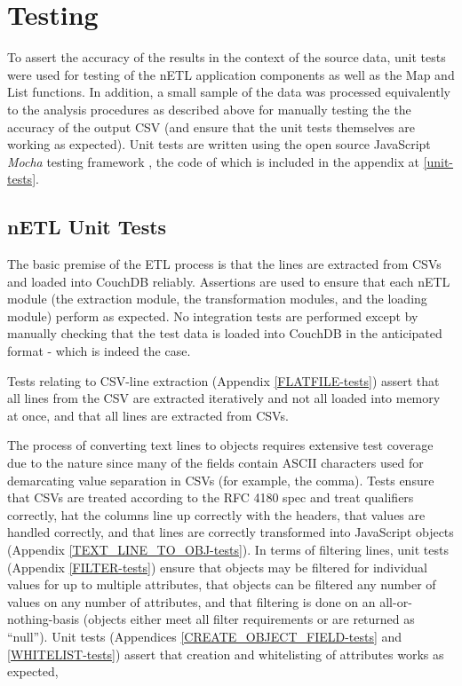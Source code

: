 \section{Testing}
To assert the accuracy of the results in the context of the source data, unit tests were used for testing of the nETL application components as well as the Map and List functions. In addition, a small sample of the data was processed equivalently to the analysis procedures as described above for manually testing the the accuracy of the output CSV (and ensure that the unit tests themselves are working as expected). Unit tests are written using the open source JavaScript \textit{Mocha} testing framework \cite{mochaTest}, the code of which is included in the appendix at \ref{unit-tests}.

\subsection{nETL Unit Tests}
The basic premise of the ETL process is that the lines are extracted from CSVs and loaded into CouchDB reliably. Assertions are used to ensure that each nETL module (the extraction module, the transformation modules, and the loading module) perform as expected. No integration tests are performed except by manually checking that the test data is loaded into CouchDB in the anticipated format - which is indeed the case.

Tests relating to CSV-line extraction (Appendix \ref{FLATFILE-tests}) assert that all lines from the CSV are extracted iteratively and not all loaded into memory at once, and that all lines are extracted from CSVs.

The process of converting text lines to objects requires extensive test coverage due to the nature since many of the fields contain ASCII characters used for demarcating value separation in CSVs (for example, the comma). Tests ensure that CSVs are treated according to the RFC 4180 spec and treat qualifiers correctly, hat the columns line up correctly with the headers, that values are handled correctly, and that lines are correctly transformed into JavaScript objects (Appendix \ref{TEXT_LINE_TO_OBJ-tests}). In terms of filtering lines, unit tests (Appendix \ref{FILTER-tests}) ensure that objects may be filtered for individual values for up to multiple attributes, that objects can be filtered any number of values on any number of attributes, and that filtering is done on an all-or-nothing-basis (objects either meet all filter requirements or are returned as ``null''). Unit tests (Appendices \ref{CREATE_OBJECT_FIELD-tests} and \ref{WHITELIST-tests}) assert that creation and whitelisting of attributes works as expected,

